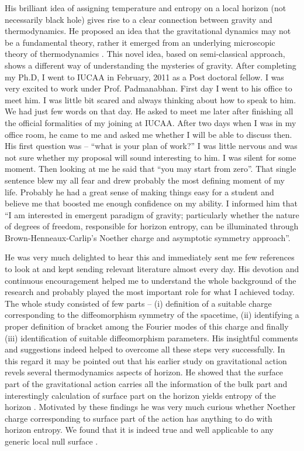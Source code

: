 \documentclass[prd, preprint, longbibliography, 12pt]{revtex4-2}
\begin{document}
His brilliant idea of assigning temperature and entropy on a local horizon (not necessarily black hole) gives rise to a clear connection between gravity and thermodynamics. He proposed an idea that the gravitational dynamics may not be a fundamental theory, rather it  emerged from an underlying microscopic theory of thermodynamics \cite{Padmanabhan:2014jta}. This novel idea, based on semi-classical approach, shows a different way of understanding the mysteries of gravity. After completing my Ph.D, I went to IUCAA in February, 2011 as a Post doctoral fellow. I was very excited to work under Prof. Padmanabhan. First day I went to his office to meet him. I was little bit scared and always thinking about how to speak to him. We had just few words on that day. He asked to meet me later after finishing all the official formalities of my joining at IUCAA. After two days when I was in my office room, he came to me and asked me whether I will be able to discuss then. His first question was --  ``what is your plan of work?'' I was little nervous and was not sure whether my proposal will sound interesting to him. I was silent for some moment. Then looking at me he said that ``you may start from zero''.  That single sentence blew my all fear and drew probably the most defining moment of my life. Probably he had a great sense of making things easy for a student and believe me that  boosted me enough confidence on my ability. I informed him that ``I am interested in emergent paradigm of gravity; particularly whether the nature of degrees of freedom, responsible for horizon entropy, can be illuminated through Brown-Henneaux-Carlip's \cite{Brown:1986nw,Carlip:1998wz} Noether charge and asymptotic symmetry approach''.  

He was very much delighted to hear this and immediately sent me few references to look at and kept sending relevant literature almost every day. His devotion and continuous encouragement helped me to understand the whole background of the research and probably played the most important role for what I achieved today. The whole study  consisted of few parts -- (i) definition of a suitable charge corresponding to the diffeomorphism symmetry of the spacetime, (ii) identifying a proper definition of bracket among the Fourier modes of this charge and finally (iii) identification of suitable diffeomorphism parameters. His insightful comments and suggestions indeed helped to overcome all these steps very successfully. In this regard it may be pointed out that his earlier study \cite{Padmanabhan:2009vy} on gravitational action revels several thermodynamics aspects of horizon. He showed that the surface part of the gravitational action carries all the information of the bulk part and interestingly calculation of surface part on the horizon yields entropy of the horizon \cite{Padmanabhan:2009vy}. Motivated by these findings he was very much curious whether Noether charge corresponding to surface part of the action has anything to do with horizon entropy. We found that it is indeed 
true and well applicable to any generic local null surface \cite{Majhi:2012tf,Bhattacharya:2018epn}. 
\end{document}
